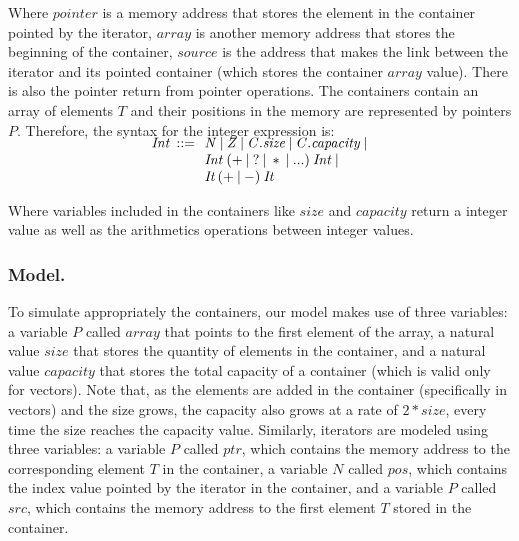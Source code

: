 \documentclass[a4paper]{llncs}
\newcommand{\comment}[1]{}
\begin{document}
Where $pointer$ is a memory address that stores the element
in the container pointed by the iterator, $array$ is another
memory address that stores the beginning of the container,
$source$ is the address that makes the link between the iterator
and its pointed container (which stores the container $array$ value).
There is also the pointer return from pointer operations.
The containers contain an array of elements $T$ and their
positions in the memory are represented by pointers $P$.
Therefore, the syntax for the integer expression is:
%
\[\begin{array}{r@{\:\:}c@{\:\:}l}
\\[-5ex]
\mathit{Int}  & ::= & \: \mathit{N} \: | \: \mathit{Z} \: | \: \mathit{C.size} \: | \: \mathit{C.capacity} \: | \\
              &     & \: \mathit{Int} \: ( + \: | \: ? \: | \: * \: | \: ...) \: \mathit{Int}  \: | \\
              &     & \: \textit{It} \: ( + \: | \: - ) \:  \textit{It}
\end{array}
\]

Where variables included in the containers
like $\mathit{size}$ and $\mathit{capacity}$ return
a integer value as well as the arithmetics
operations between integer values.

\comment{
For the proper container expressions, we model the operations
$\mathit{insert\left(It, T, N\right)}$ and
$\mathit{erase \left(ipos, it_0, it_k\right)}$
As part of the single static assign (SSA) transformation, side-effects
on the containers are made explicit, so that every operation returns a new
container as a result. For example, $\mathit{c.insert\left(x,y,z\right)}$
becomes $\mathit{c' = c.insert\left(x,y,z\right)}$. Each $T$-container $c$
is modelled as a structure

struct {
  int size;
  int capacity;
  T[capacity] elems
}
}

\subsubsection{Model.}

To simulate appropriately the containers, our model makes
use of three variables: a variable $P$ called $array$ that points
to the first element of the array, a natural value $size$ that stores
the quantity of elements in the container, and a natural value $capacity$
that stores the total capacity of a container (which is valid only for vectors).
Note that, as the elements are added in the container (specifically in vectors)
and the size grows, the capacity also grows at a rate of $2*size$, every time
the size reaches the capacity value. Similarly, iterators are modeled using
three variables: a variable $P$ called $ptr$, which contains the memory address
to the corresponding element $T$ in the container, a variable $N$ called $pos$,
which contains the index value pointed by the iterator in the container, and a
variable $P$ called $src$, which contains the memory address to the first
element $T$ stored in the container.
\end{document}
